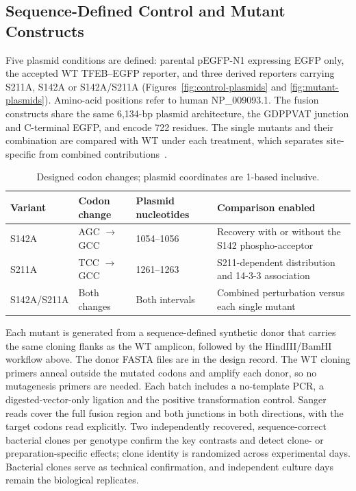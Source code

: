 \subsection{Sequence-Defined Control and Mutant Constructs}\label{sec:control-constructs}
Five plasmid conditions are defined: parental pEGFP-N1 expressing EGFP only, the accepted WT TFEB--EGFP reporter, and three derived reporters carrying S211A, S142A or S142A/S211A (Figures~\ref{fig:control-plasmids} and \ref{fig:mutant-plasmids}). Amino-acid positions refer to human NP\_009093.1. The fusion constructs share the same 6,134-bp plasmid architecture, the GDPPVAT junction and C-terminal EGFP, and encode 722 residues. The single mutants and their combination are compared with WT under each treatment, which separates site-specific from combined contributions~\cite{Vega2017,Napolitano2018}.

\begin{table}[htbp]
\centering\small
\caption{Designed codon changes; plasmid coordinates are 1-based inclusive.}
\begin{tabularx}{\textwidth}{l l l Y}
\toprule Variant & Codon change & Plasmid nucleotides & Comparison enabled \\
\midrule
S142A & AGC $\rightarrow$ GCC & 1054--1056 & Recovery with or without the S142 phospho-acceptor \\
S211A & TCC $\rightarrow$ GCC & 1261--1263 & S211-dependent distribution and 14-3-3 association \\
S142A/S211A & Both changes & Both intervals & Combined perturbation versus each single mutant \\
\bottomrule
\end{tabularx}
\end{table}

Each mutant is generated from a sequence-defined synthetic donor that carries the same cloning flanks as the WT amplicon, followed by the HindIII/BamHI workflow above. The donor FASTA files are in the design record. The WT cloning primers anneal outside the mutated codons and amplify each donor, so no mutagenesis primers are needed. Each batch includes a no-template PCR, a digested-vector-only ligation and the positive transformation control. Sanger reads cover the full fusion region and both junctions in both directions, with the target codons read explicitly. Two independently recovered, sequence-correct bacterial clones per genotype confirm the key contrasts and detect clone- or preparation-specific effects; clone identity is randomized across experimental days. Bacterial clones serve as technical confirmation, and independent culture days remain the biological replicates.

